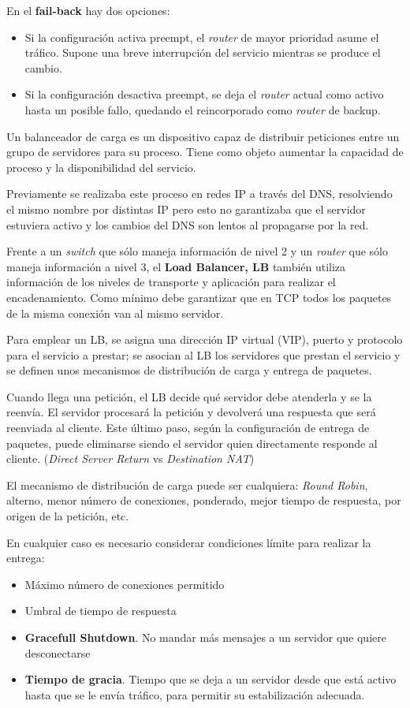 En el \textbf{fail-back} hay dos opciones:
\begin{itemize}
\item Si la configuración activa preempt, el \textit{router} de mayor prioridad asume el tráfico. Supone una breve interrupción del servicio mientras se produce el cambio.
\item Si la configuración desactiva preempt, se deja el \textit{router} actual como activo hasta un posible fallo, quedando el reincorporado como \textit{router} de backup.
\end{itemize}

\begin{defn}
Un balanceador de carga es un dispositivo capaz de distribuir peticiones entre un grupo de servidores para su proceso. Tiene como objeto aumentar la capacidad de proceso y la disponibilidad del servicio.

Previamente se realizaba este proceso en redes IP a través del DNS, resolviendo el mismo nombre por distintas IP pero esto no garantizaba que el servidor estuviera activo y los cambios del DNS son lentos al propagarse por la red.

Frente a un \textit{switch} que sólo maneja información de nivel 2 y un \textit{router} que sólo maneja información a nivel 3, el \textbf{Load Balancer, LB} también utiliza información de los niveles de transporte y aplicación para realizar el encadenamiento. Como mínimo debe garantizar que en TCP todos los paquetes de la misma conexión van al mismo servidor.
\end{defn}

Para emplear un LB, se asigna una dirección IP virtual (VIP), puerto y protocolo para el servicio a prestar; se asocian al LB los servidores que prestan el servicio y se definen unos mecanismos de distribución de carga y entrega de paquetes.

Cuando llega una petición, el LB decide qué servidor debe atenderla y se la reenvía. El servidor procesará la petición y devolverá una respuesta que será reenviada al cliente. Este último paso, según la configuración de entrega de paquetes, puede eliminarse siendo el servidor quien directamente responde al cliente. (\textit{Direct Server Return} vs \textit{Destination NAT})

El mecanismo de distribución de carga puede ser cualquiera: \textit{Round Robin}, alterno, menor número de conexiones, ponderado, mejor tiempo de respuesta, por origen de la petición, etc.

En cualquier caso es necesario considerar condiciones límite para realizar la entrega:
\begin{itemize}
\item Máximo número de conexiones permitido
\item Umbral de tiempo de respuesta
\item \textbf{Gracefull Shutdown}. No mandar más mensajes a un servidor que quiere desconectarse
\item \textbf{Tiempo de gracia}. Tiempo que se deja a un servidor desde que está activo hasta que se le envía tráfico, para permitir su estabilización adecuada.
\end{itemize}

